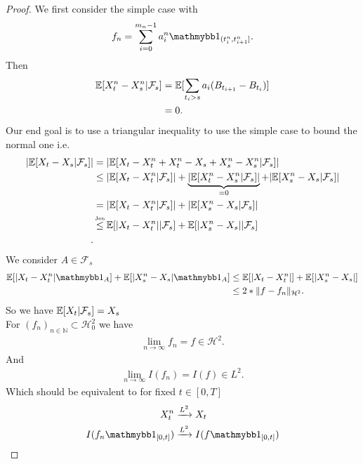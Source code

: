 \begin{proof}
 We first consider the simple case with 
 \begin{align*}
   f_n = \sum_{i=0}^{m_n - 1} a_i^{n}  \cha_{(t_i^{n},t_{i+1}^{n}  ]}
 .\end{align*}
 Then 
 \begin{align*}
   \mathbb{E}[X_{t}^{n} - X_{s}^{n} | \mathcal{F}_s  ] &= \mathbb{E}[\sum_{t_i > s} a_i(B_{t_{i+1}}-B_{t_i})]\\
                                               &=  0
 .\end{align*}
Our end goal is to use a triangular inequality to use the simple case to bound the normal one i.e.
\begin{align*}
  \abs{\E[X_t-X_s|\mathcal{F}_s]} &= \abs{\E[X_t-X_{t}^{n}+X_{t}^{n} -X_s +X_{s}^{n} -X_{s}^{n}  |\mathcal{F}_s]}\\
                                  &\le \abs{\E[X_t-X_{t}^{n}|\mathcal{F}_s]} + \underbrace{\abs{\E[X_{t}^{n} -X_{s}^{n}  |\mathcal{F}_s]}}_{=0} + \abs{\E[X_{s}^{n}-X_s|\mathcal{F}_s ]}\\
                                  &= \abs{\E[X_t-X_{t}^{n}|\mathcal{F}_s]} + \abs{\E[X_{s}^{n}-X_s|\mathcal{F}_s ]}\\
                                  &\myS{Jen}{\le } \E[\abs{X_t-X_{t}^{n}}|\mathcal{F}_s] + \E[\abs{X_{s}^{n}-X_s}|\mathcal{F}_s ]\\
.\end{align*}
We consider $A \in  \mathcal{F}_s$
\begin{align*}
  \E[\abs{X_t-X_{t}^{n}}\cha_A] + \E[\abs{X_{s}^{n}-X_s}\cha_A ] &\le \E[\abs{X_t-X_{t}^{n}}] + \E[\abs{X_{s}^{n}-X_s} ]\\
                                                                 &\le 2*\|f-f_n\|_{\mathcal{H}^2}
.\end{align*}
So we have $\mathbb{E}[X_t |\mathcal{F}_s] = X_s$\\[1ex]
For $(f_n)_{n \in  \mathbb{N}} \subset \mathcal{H}^2_0 $ we have 
\begin{align*}
  \lim_{n\to \infty}f_n = f \in \mathcal{H}^2
.\end{align*}
And 
\begin{align*}
  \lim_{n \to \infty} I(f_n) = I(f) \in L^2
.\end{align*}
Which should be equivalent to for fixed $t \in  [0,T]$
\begin{align*}
  X_t^n &\xrightarrow{L^2}  X_t \\
  I(f_n\cha_{[0,t]}) &\xrightarrow{L^2} I(f\cha_{[0,t]})

\end{align*}
\end{proof}
